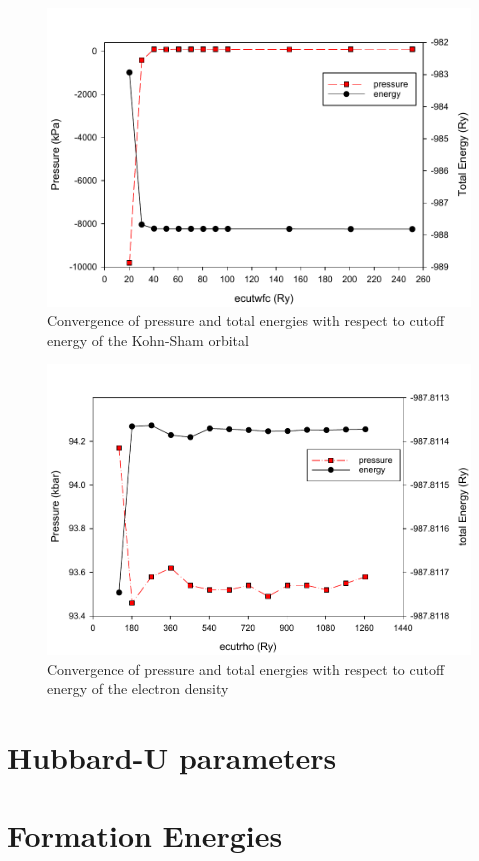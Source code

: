 \begin{figure}[tbh!]
	\centering
	\includegraphics[width=0.8\linewidth]{"images/rnd/ecutwfc"}
	\caption[Convergence of pressure and total energies with respect to cutoff energy of the Kohn-Sham orbital]{Convergence of pressure and total energies with respect to cutoff energy of the Kohn-Sham orbital}
\end{figure}

\begin{figure}[tbh!]
	\centering
	\includegraphics[width=0.8\linewidth]{"images/rnd/ecutrho"}
	\caption[Convergence of pressure and total energies with respect to cutoff energy of the electron density]{Convergence of pressure and total energies with respect to cutoff energy of the electron density}
\end{figure}

\section{Hubbard-U parameters}
\section{Formation Energies}
